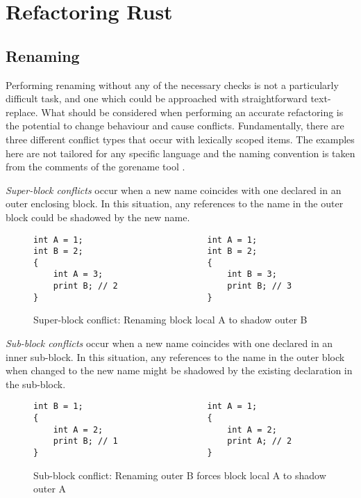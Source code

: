 \section{Refactoring Rust}\label{C:wd}

\subsection{Renaming}

Performing renaming without any of the necessary checks is not a particularly difficult task, and one which could be approached with straightforward text-replace. What should be considered when performing an accurate refactoring is the potential to change behaviour and cause conflicts. Fundamentally, there are three different conflict types that occur with lexically scoped items. The examples here are not tailored for any specific language and the naming convention is taken from the comments of the gorename tool \cite{gorename15}.

\textit{Super-block conflicts} occur when a new name coincides with one declared in an outer enclosing block. In this situation, any references to the name in the outer block could be shadowed by the new name.

\begin{figure}[h]
\begin{verbatim}
int A = 1;                         int A = 1;
int B = 2;                         int B = 2;
{                                  {
    int A = 3;                         int B = 3;
    print B; // 2                      print B; // 3
}                                  }
\end{verbatim}
\caption{Super-block conflict: Renaming block local A to shadow outer B}
\label{Fig:super}
\end{figure}

\textit{Sub-block conflicts} occur when a new name coincides with one declared in an inner sub-block. In this situation, any references to the name in the outer block when changed to the new name might be shadowed by the existing declaration in the sub-block.

\begin{figure}[h]
\begin{verbatim}
int B = 1;                         int A = 1;
{                                  {
    int A = 2;                         int A = 2;
    print B; // 1                      print A; // 2
}                                  }
\end{verbatim}
\caption{Sub-block conflict: Renaming outer B forces block local A to shadow outer A}
\label{Fig:sub}
\end{figure}

